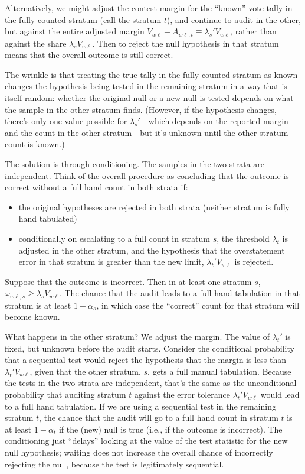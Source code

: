 Alternatively, we might adjust the contest margin for the ``known'' vote tally in the
fully counted stratum (call the stratum $t$), and continue to audit in the other, 
but against the entire adjusted
margin $V_{w\ell} - A_{w\ell,t} \equiv \lambda_s' V_{w\ell}$, rather than 
against the share $\lambda_s V_{w\ell}$.
Then to reject the null hypothesis in that stratum means that the overall outcome is still correct.

The wrinkle is that treating the true tally
in the fully counted stratum as known changes the hypothesis being tested in the remaining
stratum in a way that is itself random:
whether the original null or a new null is tested depends on what the sample in the other stratum
finds.
(However, if the hypothesis changes, there's only one value possible for $\lambda_s'$---which
depends on the reported margin and the count in the other stratum---but it's unknown 
until the other stratum count is known.)

The solution is through conditioning. 
The samples in the two strata are independent. 
Think of the overall procedure as concluding that the outcome is correct without a full
hand count in both strata if:

\begin{itemize}
   \item the original hypotheses are rejected in both strata (neither stratum is fully hand tabulated)
   \item conditionally on escalating to a full count in stratum $s$, the threshold $\lambda_t$
            is adjusted in the other stratum, and the hypothesis that the overstatement error
            in that stratum is greater than the new limit, $\lambda_t' V_{w\ell}$ is rejected. 
\end{itemize}

Suppose that the outcome is incorrect. 
Then in at least one stratum $s$, $\omega_{w\ell,s}\ge \lambda_s V_{w\ell}$.
The chance that the audit leads to a full hand tabulation in that stratum is at least $1-\alpha_s$,
in which case the ``correct'' count for that stratum will become known.

What happens in the other stratum?
We adjust the margin.
The value of $\lambda_t'$ is fixed, but unknown before the audit starts.
Consider the conditional probability that a sequential test would reject the hypothesis that the margin is less than $\lambda_t' V_{w\ell}$, given that the other stratum, $s$, gets a full manual tabulation. 
Because the tests in the two strata are independent, that's the same as the unconditional probability
that auditing stratum $t$ against the error tolerance $\lambda_t' V_{w\ell}$ would lead to a full
hand tabulation. 
If we are using a sequential test in the remaining stratum $t$, the chance that the audit will
go to a full hand count in stratum $t$ is at least $1-\alpha_t$ if the (new) null is true (i.e.,
if the outcome is incorrect). 
The conditioning just ``delays'' looking at the value of the test statistic for the new null hypothesis; waiting does not increase the overall chance of incorrectly rejecting the null, 
because the test is legitimately sequential.

